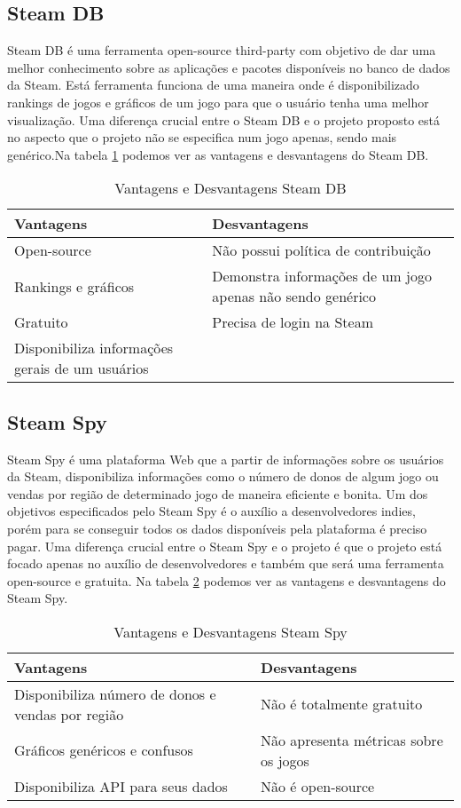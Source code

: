 \subsection{Steam DB}
Steam DB é uma ferramenta open-source third-party com objetivo de dar uma melhor conhecimento sobre as aplicações e pacotes disponíveis no banco de dados da Steam\cite{steam_db}. Está ferramenta funciona de uma maneira onde é disponibilizado rankings de jogos e gráficos de um jogo para que o usuário tenha uma melhor visualização. Uma diferença crucial entre o Steam DB e o projeto proposto está no aspecto que o projeto não se especifica num jogo apenas, sendo mais genérico.Na tabela \ref{table:steam_db} podemos ver as vantagens e desvantagens do Steam DB.
\begin{table}
\centering
\begin{tabular}{|p{7cm}|p{7cm}|}
\hline \textbf{Vantagens} & \textbf{Desvantagens} \\
\hline Open-source & Não possui política de contribuição \\
\hline Rankings e gráficos & Demonstra informações de um jogo apenas não sendo genérico \\
\hline Gratuito & Precisa de login na Steam \\
\hline Disponibiliza informações gerais de um usuários & \\
\hline
\end{tabular}
\caption{Vantagens e Desvantagens Steam DB}
\label{table:steam_db}
\end{table}
\subsection{Steam Spy}
Steam Spy é uma plataforma Web que a partir de informações sobre os usuários da Steam, disponibiliza informações como o número de donos de algum jogo ou vendas por região de determinado jogo de maneira eficiente e bonita\cite{steam_spy}. Um dos objetivos especificados pelo Steam Spy é o auxílio a desenvolvedores indies, porém para se conseguir todos os dados disponíveis pela plataforma é preciso pagar. Uma diferença crucial entre o Steam Spy e o projeto é que o projeto está focado apenas no auxílio de desenvolvedores e também que será uma ferramenta open-source e gratuita. Na tabela \ref{table:steam_spy} podemos ver as vantagens e desvantagens do Steam Spy.
\begin{table}
\centering
\begin{tabular}{|p{7cm}|p{7cm}|}
\hline \textbf{Vantagens} & \textbf{Desvantagens} \\
\hline Disponibiliza número de donos e vendas por região & Não é totalmente gratuito \\
\hline Gráficos genéricos e confusos & Não apresenta métricas sobre os jogos \\
\hline Disponibiliza API para seus dados & Não é open-source \\
\hline
\end{tabular}
\caption{Vantagens e Desvantagens Steam Spy}
\label{table:steam_spy}
\end{table}
